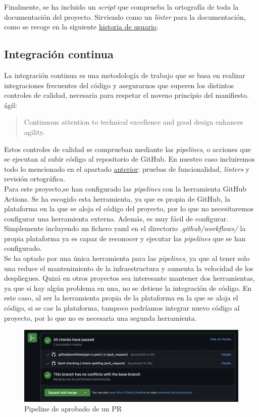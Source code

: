 Finalmente, se ha incluido un \textit{script} que comprueba la ortografía de toda la documentación del proyecto.
Sirviendo como un \textit{linter} para la documentación, como se recoge en la siguiente
\href{https://github.com/Torchu/flixbuff/issues/4}{historia de usuario}.\\

\subsection{Integración continua}

La integración continua es una metodología de trabajo que se basa en realizar integraciones frecuentes del código y
asegurarnos que superen los distintos controles de calidad, necesaria para respetar el noveno principio del manifiesto.
ágil:
\begin{quote}
    Continuous attention to technical excellence and good design enhances agility.
\end{quote}


Estos controles de calidad se comprueban mediante las \textit{pipelines}, o acciones que se ejecutan al subir código
al repositorio de GitHub. En nuestro caso incluiremos todo lo mencionado en el apartado
\hyperref[sec:control_de_calidad]{anterior}: pruebas de funcionalidad, \textit{linters} y revisión ortográfica.\\

Para este proyecto,se han configurado las \textit{pipelines} con la herramienta GitHub Actions. Se ha escogido esta
herramienta, ya que es propia de GitHub, la plataforma en la que se aloja el código del proyecto, por lo que no
necesitaremos configurar una herramienta externa. Además, es muy fácil de configurar. Simplemente incluyendo un fichero
yaml en el directorio \textit{.github/workflows/} la propia plataforma ya es capaz de reconocer y ejecutar las
\textit{pipelines} que se han configurado.\\

Se ha optado por una única herramienta para las \textit{pipelines}, ya que al tener solo una reduce el mantenimiento de
la infraestructura y aumenta la velocidad de los despliegues. Quizá en otros proyectos sea interesante mantener dos
herramientas, ya que si hay algún problema en una, no se detiene la integración de código. En este caso, al ser la
herramienta propia de la plataforma en la que se aloja el código, si se cae la plataforma, tampoco podríamos integrar
nuevo código al proyecto, por lo que no es necesaria una segunda herramienta.

\begin{figure}[H]
	\centering	
	\includegraphics[scale=0.4]{img/pipeline.png}
	\caption{Pipeline de aprobado de un PR}\label{fig:pipeline_succeded}
\end{figure}
